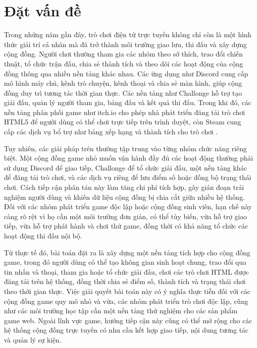 \documentclass[../DoAn.tex]{subfiles}
\begin{document}
\section{Đặt vấn đề}
\label{section:1.1}

Trong những năm gần đây, trò chơi điện tử trực tuyến không chỉ còn là một hình thức giải trí cá nhân mà đã trở thành môi trường giao lưu, thi đấu và xây dựng cộng đồng. Người chơi thường tham gia các nhóm theo sở thích, trao đổi chiến thuật, tổ chức trận đấu, chia sẻ thành tích và theo dõi các hoạt động của cộng đồng thông qua nhiều nền tảng khác nhau. Các ứng dụng như Discord cung cấp mô hình máy chủ, kênh trò chuyện, kênh thoại và chia sẻ màn hình, giúp cộng đồng duy trì tương tác thời gian thực. Các nền tảng như Challonge hỗ trợ tạo giải đấu, quản lý người tham gia, bảng đấu và kết quả thi đấu. Trong khi đó, các nền tảng phân phối game như itch.io cho phép nhà phát triển đăng tải trò chơi HTML5 để người dùng có thể chơi trực tiếp trên trình duyệt, còn Steam cung cấp các dịch vụ bổ trợ như bảng xếp hạng và thành tích cho trò chơi \cite{discord-developer-docs,challonge-api,itchio-html5,steamworks-docs}.

Tuy nhiên, các giải pháp trên thường tập trung vào từng nhóm chức năng riêng biệt. Một cộng đồng game nhỏ muốn vận hành đầy đủ các hoạt động thường phải sử dụng Discord để giao tiếp, Challonge để tổ chức giải đấu, một nền tảng khác để đăng tải trò chơi, và các dịch vụ riêng để lưu điểm số hoặc đồng bộ trạng thái chơi. Cách tiếp cận phân tán này làm tăng chi phí tích hợp, gây gián đoạn trải nghiệm người dùng và khiến dữ liệu cộng đồng bị chia cắt giữa nhiều hệ thống. Đối với các nhóm phát triển game độc lập hoặc cộng đồng sinh viên, hạn chế này càng rõ rệt vì họ cần một môi trường đơn giản, có thể tùy biến, vừa hỗ trợ giao tiếp, vừa hỗ trợ phát hành và chơi thử game, đồng thời có khả năng tổ chức các hoạt động thi đấu nội bộ.

Từ thực tế đó, bài toán đặt ra là xây dựng một nền tảng tích hợp cho cộng đồng game, trong đó người dùng có thể tạo không gian sinh hoạt chung, trao đổi qua tin nhắn và thoại, tham gia hoặc tổ chức giải đấu, chơi các trò chơi HTML được đăng tải trên hệ thống, đồng thời chia sẻ điểm số, thành tích và trạng thái chơi theo thời gian thực. Việc giải quyết bài toán này có ý nghĩa thực tiễn đối với các cộng đồng game quy mô nhỏ và vừa, các nhóm phát triển trò chơi độc lập, cũng như các môi trường học tập cần một nền tảng thử nghiệm cho các sản phẩm game web. Ngoài lĩnh vực game, hướng tiếp cận này cũng có thể mở rộng cho các hệ thống cộng đồng trực tuyến có nhu cầu kết hợp giao tiếp, nội dung tương tác và quản lý sự kiện.
\end{document}
